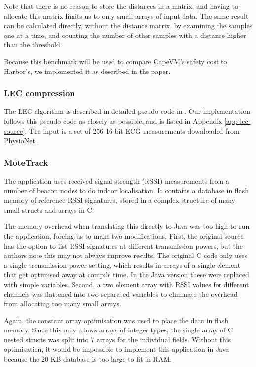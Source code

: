 Note that there is no reason to store the distances in a matrix, and having to allocate this matrix limits us to only small arrays of input data. The same result can be calculated directly, without the distance matrix, by examining the samples one at a time, and counting the number of other samples with a distance higher than the threshold.

Because this benchmark will be used to compare CapeVM's safety cost to Harbor's, we implemented it as described in the paper.

\subsubsection{LEC compression}
The LEC algorithm is described in detailed pseudo code in \cite{Marcelloni:2009ja}. Our implementation follows this pseudo code as closely as possible, and is listed in Appendix \ref{app-lec-source}. The input is a set of 256 16-bit ECG measurements downloaded from PhysioNet \cite{physionet-ecg-data}.

\subsubsection{MoteTrack}
\label{sec-evaluation-benchmark-implementation-motetrack}
The  application uses received signal strength (RSSI) measurements from a number of beacon nodes to do indoor localisation. It contains a database in flash memory of reference RSSI signatures, stored in a complex structure of many small structs and arrays in C.

The memory overhead when translating this directly to Java was too high to run the application, forcing us to make two modifications. First, the original source has the option to list RSSI signatures at different transmission powers, but the authors note this may not always improve results. The original C code only uses a single transmission power setting, which results in arrays of a single element that get optimised away at compile time. In the Java version these were replaced with simple variables. Second, a two element array with RSSI values for different channels was flattened into two separated variables to eliminate the overhead from allocating too many small arrays.

Again, the constant array optimisation was used to place the data in flash memory. Since this only allows arrays of integer types, the single array of C nested structs was split into 7 arrays for the individual fields. Without this optimisation, it would be impossible to implement this application in Java because the 20 KB database is too large to fit in RAM.

